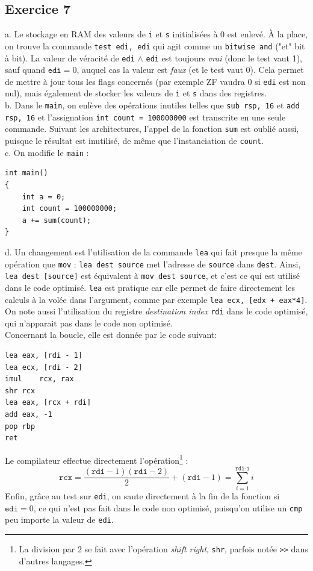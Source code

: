 \documentclass[11pt, a4 paper]{article}
\begin{document}
\subsection{Exercice 7}
a. Le stockage en RAM des valeurs de \texttt{i} et \texttt{s} initialisées à 0 est enlevé. À la place, on trouve la commande \texttt{test edi, edi} qui agit comme un \texttt{bitwise and} ("et" bit à bit).
La valeur de véracité de \texttt{edi} $\wedge$ \texttt{edi} est toujours \textit{vrai} (donc le test vaut 1), sauf quand $\texttt{edi}=0$, auquel cas la valeur est \textit{faux} (et le test vaut 0).
Cela permet de mettre à jour tous les flags concernés (par exemple ZF vaudra 0 si \texttt{edi} est non nul), mais également de stocker les valeurs de \texttt{i} et \texttt{s} dans des registres.\\

b. Dans le \texttt{main}, on enlève des opérations inutiles telles que \texttt{sub	rsp, 16} et \texttt{add	rsp, 16} et l'assignation \texttt{int count = 100000000} est transcrite en une seule commande. Suivant les architectures, l'appel de la fonction \texttt{sum} est oublié aussi, puisque le résultat est inutilisé, de même que l'instanciation de \texttt{count}.\\

c. On modifie le \texttt{main} :
\begin{lstlisting}[style=CStyle]
int main()
{
    int a = 0;
    int count = 100000000;
    a += sum(count);
}
\end{lstlisting}

d. Un changement est l'utilisation de la commande \texttt{lea} qui fait presque la même opération que \texttt{mov} : \texttt{lea dest source} met l'adresse de \texttt{source} dans \texttt{dest}. Ainsi, \texttt{lea dest [source]} est équivalent à \texttt{mov dest source}, et c'est ce qui est utilisé dans le code optimisé.
\texttt{lea} est pratique car elle permet de faire directement les calculs à la volée dans l'argument, comme par exemple \texttt{lea ecx, [edx + eax*4]}. \\
On note aussi l'utilisation du registre \textit{destination index} \texttt{rdi} dans le code optimisé, qui n'apparait pas dans le code non optimisé.\\
Concernant la boucle, elle est donnée par le code suivant:
\begin{lstlisting}[style=customasm]
lea	eax, [rdi - 1]
lea	ecx, [rdi - 2]
imul	rcx, rax
shr	rcx
lea	eax, [rcx + rdi]
add	eax, -1
pop	rbp
ret
\end{lstlisting}
Le compilateur effectue directement l'opération\footnote{La division par 2 se fait avec l'opération \textit{shift right}, \texttt{shr}, parfois notée \texttt{>>} dans d'autres langages.} :
\begin{equation*}
    \texttt{rcx} = \frac{(\texttt{rdi}-1)(\texttt{rdi}-2)}{2} + (\texttt{rdi}-1) = \displaystyle\sum_{i=1}^{\texttt{rdi-1}}i
\end{equation*}
Enfin, grâce au test sur \texttt{edi}, on saute directement à la fin de la fonction si $\texttt{edi} = 0$, ce qui n'est pas fait dans le code non optimisé, puisqu'on utilise un \texttt{cmp} peu importe la valeur de \texttt{edi}.\\
\end{document}
